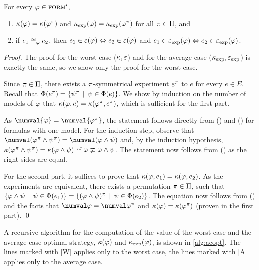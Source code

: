 \begin{theorem}
For every $\varphi\in{\textsc{form}'}$,
\begin{enumerate}
\item $\kappa(\varphi) = \kappa(\varphi^\pi)$ and $\kappa_\textrm{exp}(\varphi) = \kappa_\textrm{exp}(\varphi^\pi)$ for all $\pi\in\Pi$, and
\item if $e_1\cong_{\varphi} e_2$, then $e_1\in\varepsilon(\varphi) \Leftrightarrow e_2\in\varepsilon(\varphi)$ and
  $e_1\in\varepsilon_\textrm{exp}(\varphi) \Leftrightarrow e_2\in\varepsilon_\textrm{exp}(\varphi)$.
\end{enumerate}
\end{theorem}

\begin{proof}
The proof for the worst case ($\kappa, \varepsilon$)
  and for the average case ($\kappa_\textrm{exp}, \varepsilon_\textrm{exp}$) is exactly the same,
  so we show only the proof for the worst case.

Since $\pi\in\Pi$, there exists a $\pi$-symmetrical experiment $e^\pi$
  to $e$ for every $e\in E$.
Recall that $\Phi(e^\pi) = \{ \psi^\pi \:\:|\:\: \psi\in\Phi(e)\}$.
We show by induction on the number of models of $\varphi$
  that $\kappa(\varphi, e) = \kappa(\varphi^\pi, e^\pi)$,
  which is sufficient for the first part.

As $\numval{\form} = \numval{\form^\perm}$, the statement follows directly from
  () and () for formulas with one model.
For the induction step, observe that
  $\numval(\form^\perm \wedge \formx^\perm) = \numval(\form\wedge\formx)$
  and, by the induction hypothesis,
  $\kappa(\varphi^\pi \wedge \psi^\pi) = \kappa(\varphi\wedge\psi)$
  if $\varphi \not\equiv \varphi\wedge\psi$.
The statement now follows from ()
  as the right sides are equal.

For the second part, it suffices to prove that
  $\kappa(\varphi, e_1) = \kappa(\varphi, e_2)$.
As the experiments are equivalent, there exists a permutation $\pi\in\Pi$,
 such that
 $\{\varphi\wedge\psi \:\:|\:\:\psi\in\Phi(e_1)\} =
 \{(\varphi\wedge\psi)^\pi \:\:|\:\:\psi\in\Phi(e_2)\}$.
The equation now follows from () and the facts that
 $\numval\form=\numval\form^\perm$ and $\kappa(\varphi) = \kappa(\varphi^\pi)$
 (proven in the first part). \qed
\end{proof}

A recursive algorithm for the computation of the value
  of the worst-case and the average-case optimal strategy,
  $\kappa(\varphi)$ and $\kappa_\textrm{exp}(\varphi)$, is shown in \autoref{alg:acopt}.
The lines marked with [W] applies only to the worst case,
  the lines marked with [A] applies only to the average case.

